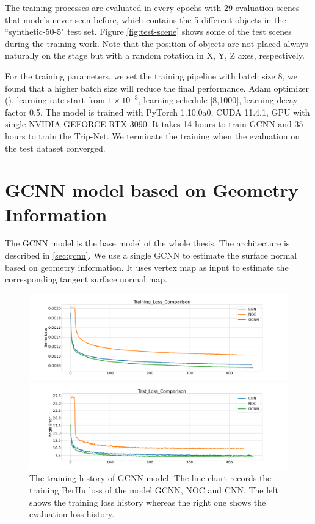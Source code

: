 \documentclass[border=15pt, multi, tikz]{article}
\begin{document}
The training processes are evaluated in every epochs with 29 evaluation scenes that models never seen before, which contains the 5 different objects in the ``synthetic-50-5" test set. Figure \ref{fig:test-scene} shows some of the test scenes during the training work. Note that the position of objects are not placed always naturally on the stage but with a random rotation in X, Y, Z axes, respectively.

For the training parameters, we set the training pipeline with batch size $ 8 $, we found that a higher batch size will reduce the final performance.  Adam optimizer (\cite{adam}), learning rate start from  $ 1\times10^{-3} $, learning schedule [8,1000], learning decay factor 0.5. The model is trained with PyTorch 1.10.0a0, CUDA 11.4.1, GPU with single NVIDIA GEFORCE RTX 3090. It takes 14 hours to train GCNN and 35 hours to train the Trip-Net. We terminate the training when the evaluation on the test dataset converged.


\section{GCNN model based on Geometry Information}
The GCNN model is the base model of the whole thesis. The architecture is described in \ref{sec:gcnn}. We use a single GCNN to estimate the surface normal based on geometry information. It uses vertex map as input to estimate the corresponding tangent surface normal map. 


\begin{figure}[H]
	\centering
	\includegraphics[width=\textwidth]{./Figures/gcnn_training_loss.png}
	
	\includegraphics[width=\textwidth]{./Figures/gcnn_eval_loss.png}
	\caption{The training history of GCNN model. The line chart records the training BerHu loss of the model GCNN, NOC and CNN. The left shows the training loss history whereas the right one shows the evaluation loss history.}
	\label{fig:gcnn-training-history}
\end{figure}
\end{document}
